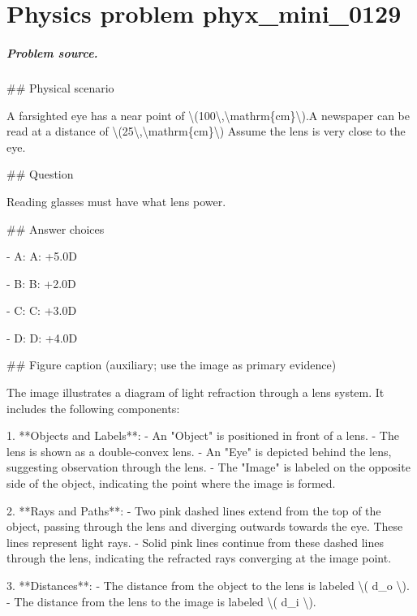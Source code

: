 
\chapter{Physics problem phyx\_mini\_0129}
\label{ch:PhyXMiniProblems_problem_phyx_mini_0129}

\paragraph{Problem source.}
\#\# Physical scenario

A farsighted eye has a near point of \textbackslash{}(100\textbackslash{},\textbackslash{}mathrm\{cm\}\textbackslash{}).A newspaper can be read at a distance of \textbackslash{}(25\textbackslash{},\textbackslash{}mathrm\{cm\}\textbackslash{}) Assume the lens is very close to the eye.

\#\# Question

Reading glasses must have what lens power.

\#\# Answer choices

- A: A: +5.0D

- B: B: +2.0D

- C: C: +3.0D

- D: D: +4.0D

\#\# Figure caption (auxiliary; use the image as primary evidence)

The image illustrates a diagram of light refraction through a lens system. It includes the following components:

1. **Objects and Labels**:
   - An "Object" is positioned in front of a lens.
   - The lens is shown as a double-convex lens.
   - An "Eye" is depicted behind the lens, suggesting observation through the lens.
   - The "Image" is labeled on the opposite side of the object, indicating the point where the image is formed.

2. **Rays and Paths**:
   - Two pink dashed lines extend from the top of the object, passing through the lens and diverging outwards towards the eye. These lines represent light rays.
   - Solid pink lines continue from these dashed lines through the lens, indicating the refracted rays converging at the image point.
   
3. **Distances**:
   - The distance from the object to the lens is labeled \textbackslash{}( d\_o \textbackslash{}).
   - The distance from the lens to the image is labeled \textbackslash{}( d\_i \textbackslash{}).

